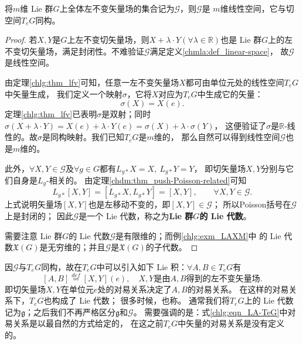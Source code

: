 \begin{theorem}\label{chlg:thm_lfvls}
    将$m$维 Lie 群$G$上全体左不变矢量场的集合记为$\mathscr{G}$，则$\mathscr{G}$是
    $m$维线性空间，它与切空间$T_eG$同构。
\end{theorem}
\begin{proof}
    若$X,Y$是$G$上左不变切矢量场，则$X+\lambda\cdot Y(\forall \lambda \in \mathbb{R})$也是
     Lie 群$G$上的左不变切矢量场，满足封闭性。不难验证$\mathscr{G}$满足定义\ref{chmla:def_linear-space}，
    故$\mathscr{G}$是线性空间。
    
    由定理\ref{chlg:thm_lfv}可知，任意一左不变矢量场$X$都可由单位元处的线性空间$T_eG$中矢量生成，
    我们定义一个映射$\sigma$，它将$X$对应为$T_eG$中生成它的矢量：
    \begin{equation}
        \sigma (X) = X(e).
    \end{equation}
    定理\ref{chlg:thm_lfv}已表明$\sigma$是双射；同时$\sigma (X+\lambda \cdot Y)
    = X(e)+\lambda\cdot Y(e)=\sigma(X)+\lambda\cdot\sigma(Y)$，
    这便验证了$\sigma$是$\mathbb{R}$-线性的。故$\sigma$是同构映射。我们已知$T_eG$是$m$维的，
    那么自然可以得到线性空间$\mathscr{G}$也是$m$维的。
    
    此外，$\forall X,Y\in \mathscr{G}$及$\forall g\in G$都有$L_{g*}X=X,\ L_{g*}Y=Y$，
    即切矢量场$X,Y$分别与它们自身是$L_g$-相关的。
    由定理\ref{chdm:thm_push-Poisson-related}可知  %
    \begin{equation}\label{chlg:eqn_LgXY}
        L_{g*}[X,Y]=[L_{g*}X, L_{g*}Y]=[X,Y], \qquad \forall X,Y \in \mathscr{G}.
    \end{equation}
    上式说明矢量场$[X,Y]$也是左移动不变的，即$[X,Y]\in \mathscr{G}$；
    所以Poisson括号在$\mathscr{G}$上是封闭的；
    因此$\mathscr{G}$是一个 Lie 代数，称之为\textbf{\bfseries  Lie 群$G$的 Lie 代数}。
    
    需要注意 Lie 群$G$的 Lie 代数$\mathscr{G}$是有限维的；而例\ref{chlg:exm_LAXM}中
    的 Lie 代数$\mathfrak{X}(G)$是无穷维的；并且$\mathscr{G}$是$\mathfrak{X}(G)$的子代数。
\end{proof}


因$\mathscr{G}$与$T_eG$同构，故在$T_eG$中可以引入如下 Lie 积：$\forall A, B \in T_eG$有
\begin{equation}\label{chlg:eqn_LA-TeG}
    [A, B] \overset{def}{=} [X,Y](e), \quad 
    X,Y \text{是由}A,B \text{得到的左不变矢量场}.
\end{equation}
即切矢量场$X,Y$在单位元$e$处的对易关系决定了$A, B$的对易关系。
在这样的对易关系下，$T_eG$也构成了 Lie 代数；
很多时候，也称。
通常我们将$T_eG$上的 Lie 代数记为$\mathfrak{g}$；之后我们不再严格区分$\mathfrak{g}$和$\mathscr{G}$。
需要强调的是：式\eqref{chlg:eqn_LA-TeG}中对易关系是以最自然的方式给定的，
在这之前$T_eG$中矢量的对易关系是没有定义的。

